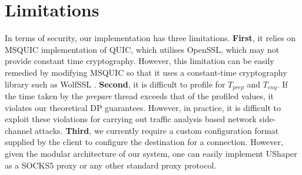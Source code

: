 \section{Limitations}
\label{sec:netshaper-limitations}

In terms of security, our implementation has three limitations.
\textbf{First}, it relies on MSQUIC implementation of QUIC, which utilises OpenSSL, which may not provide constant time cryptography.
However, this limitation can be easily remedied by modifying MSQUIC so that it uses a constant-time cryptography library such as WolfSSL \cite{wolfssl}.
\textbf{Second}, it is difficult to profile for $T_{prep}$ and $T_{enq}$. If the time taken by the \textit{prepare} thread exceeds that of the profiled values, it violates our theoretical DP guarantees. 
However, in practice, it is difficult to exploit these violations for carrying out traffic analysis based network side-channel attacks.
\textbf{Third}, we currently require a custom configuration format supplied by the client to configure the destination for a connection. However, given the modular architecture of our system, one can easily implement UShaper as a SOCKS5 proxy \cite{leech1996socks} or any other standard proxy protocol.
